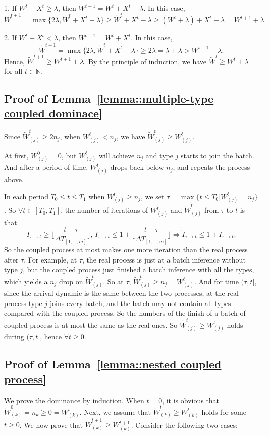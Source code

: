 \documentclass[preprint]{article}
\theoremstyle{plain}
\theoremstyle{definition}
\theoremstyle{remark}
\begin{document}
1. If $W^t + X^t \geq \lambda$, then $W^{t+1} = W^t + X^t - \lambda$. In this case,
$$\tilde{W}^{t+1}=\max\{ 2\lambda, \tilde{W}^t + X^t - \lambda \}\geq \tilde{W}^t + X^t - \lambda\geq( W^t+\lambda )+ X^t - \lambda=W^{t+1}+\lambda.$$

2. If $W^t + X^t < \lambda$, then $W^{t+1} = W^t + X^t$. In this case,
$$\tilde{W}^{t+1}=\max\{ 2\lambda, \tilde{W}^t + X^t - \lambda \}\geq 2\lambda = \lambda+\lambda>W^{t+1}+\lambda.$$
Hence, $\tilde{W}^{t+1} \geq W^{t+1} + \lambda$. By the principle of induction, we have $\tilde{W}^t \geq W^t + \lambda$ for all $t \in \mathbb{N}$.

\subsection{Proof of Lemma~\ref{lemma::multiple-type coupled dominace}}\label{appendix_lemma::proof of multiple-type coupled dominace}
Since $\tilde{W}_{(j)}^t\geq 2n_j$, when $W^t_{(j)}< n_j$, we have $\tilde{W}_{(j)}^t\geq W^t_{(j)}$.

At first, $W^0_{(j)}=0$, but $W^t_{(j)}$ will achieve $n_j$ and type $j$ starts to join the batch. And after a period of time, $W^t_{(j)}$ drops back below $n_j$, and repeats the process above.

In each period $T_0\leq t\leq T_1$ when $W^t_{(j)}\geq n_j$, we set $\tau = \max\{t\leq T_0|W^t_{(j)} = n_j \}$. So $\forall t\in [T_0, T_1]$, the number of iterations of $W^t_{(j)}$ and $\tilde{W}^t_{(j)}$ from $\tau$ to $t$ is that
$$I_{\tau\to t} \geq \lfloor\frac{t-\tau}{\Delta T_{[1,\cdots,m]}}\rfloor ,\,\tilde{I}_{\tau\to t}\leq 1+\lfloor\frac{t-\tau}{\Delta T_{[1,\cdots,m]}}\rfloor \Rightarrow \tilde{I}_{\tau\to t}\leq 1+I_{\tau\to t}.$$
So the coupled process at most makes one more iteration than the real process after $\tau$. For example, at $\tau$, the real process is  just at a batch inference without type $j$, but the coupled process just finished a batch inference with all the types, which yields a $n_j$ drop on $\tilde{W}_{(j)}^t$. So at $\tau$, $\tilde{W}_{(j)}^t\geq n_j = W_{(j)}^t$. And for time $(\tau,t]$, since the arrival dynamic is the same between the two processes,  at the real process type $j$ joins every batch, and the batch may not contain all types compared with the coupled process. So the numbers of the finish of a batch of coupled process is at most the same as the real ones. So $\tilde{W}^t_{(j )}\geq W^t_{(j )}$ holds during $(\tau, t]$, hence $\forall t\geq 0$. 

\subsection{Proof of Lemma~\ref{lemma::nested coupled process}}\label{appendix_lemma::proof of nested coupled process}
We prove the dominance by induction. When $t = 0$, it is obvious that $ \tilde{W}_{(k)}^0 = n_{k}\geq 0=W_{(k)}^t $. Next, we assume that $\tilde{W}^t_{(k)}\geq W^t_{(k)}  $ holds for some $t\geq 0$. We now prove that $\tilde{W}^{t+1}_{(k)}\geq W^{t+1}_{(k)}  $. Consider the following two cases:
\end{document}

